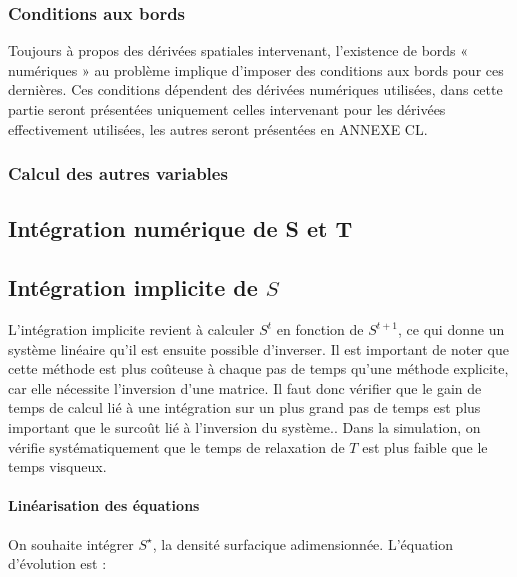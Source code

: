 \subsubsection{Conditions aux bords}

Toujours à propos des dérivées spatiales intervenant, l’existence de bords «
numériques » au problème implique d’imposer des conditions aux bords pour ces
dernières. Ces conditions dépendent des dérivées numériques utilisées, dans
cette partie seront présentées uniquement celles intervenant pour les dérivées
effectivement utilisées, les autres seront présentées en ANNEXE CL.

\subsubsection{Calcul des autres variables}


%

\subsection{Intégration numérique de S et T}\subsection{Intégration implicite de $S$}

\label{ssec:integration_S_imp}

L'intégration implicite revient à calculer $S^t$ en fonction de $S^{t+1}$, ce
qui donne un système linéaire qu'il est ensuite possible d'inverser. Il est
important de noter que cette méthode est plus coûteuse à chaque pas de temps
qu'une méthode explicite, car elle nécessite l'inversion d'une matrice. Il faut
donc vérifier que le gain de temps de calcul lié à une intégration sur un plus
grand pas de temps est plus important que le surcoût lié à l'inversion du
système.. Dans la simulation, on vérifie systématiquement que
le temps de relaxation de $T$ est plus faible que le temps visqueux.

\paragraph{Linéarisation des équations}

On souhaite intégrer $S^\star$, la densité surfacique adimensionnée. L'équation
d'évolution est :

